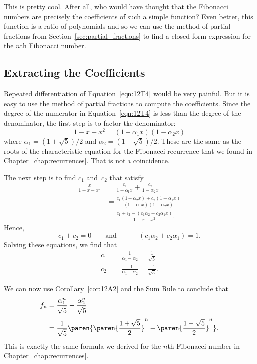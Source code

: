 This is pretty cool.  After all, who would have thought that the
Fibonacci numbers are precisely the coefficients of such a simple
function?  Even better, this function is a ratio of polynomials and so
we can use the method of partial fractions from
Section~\ref{sec:partial_fractions} to find a closed-form
expression for the $n$th Fibonacci number.

\subsection{Extracting the Coefficients}

Repeated differentiation of Equation~\ref{eqn:12T4} would be very
painful.  But it is easy to use the method of partial fractions to
compute the coefficients.  Since the degree of the numerator in
Equation~\ref{eqn:12T4} is less than the degree of the denominator,
the first step is to factor the denominator:
\begin{equation*}
    1 - x - x^2 = (1 - \alpha_1 x) (1 - \alpha_2 x)
\end{equation*}
where $\alpha_1 = (1 + \sqrt{5})/2$ and $\alpha_2 = (1 - \sqrt{5})/2$.
These are the same as the roots of the characteristic equation for the
Fibonacci recurrence that we found in Chapter~\ref{chap:recurrences}.
That is not a coincidence.

The next step is to find $c_1$ and~$c_2$ that satisfy
\begingroup
\openup 3pt
\begin{align*}
\frac{x}{1 - x - x^2}
    &= \frac{c_1}{1 - \alpha_1 x} + \frac{c_2}{1 - \alpha_2 x} \\
    &= \frac{c_1 (1 - \alpha_2 x) + c_2 (1 - \alpha_1 x)}
            {(1 - \alpha_1 x) (1 - \alpha_2 x)} \\
    &= \frac{c_1 + c_2 - (c_1 \alpha_2 + c_2 \alpha_1 x)}
            {1 - x - x^2}.
\end{align*}
\endgroup
Hence,
\begin{equation*}
    c_1 + c_2 = 0
    \qquad\text{and}\qquad
    - (c_1 \alpha_2 + c_2 \alpha_1) = 1.
\end{equation*}
Solving these equations, we find that
\begin{align*}
    c_1 &= \frac{1}{\alpha_1 - \alpha_2} = \frac{1}{\sqrt{5}} \\
    c_2 &= \frac{-1}{\alpha_1 - \alpha_2} = \frac{-1}{\sqrt{5}}.
\end{align*}

We can now use Corollary~\ref{cor:12A2} and the Sum Rule to conclude
that
\begin{align*}
f_n &= \frac{\alpha_1^n}{\sqrt{5}} - \frac{\alpha_2^n}{\sqrt{5}} \\[3pt]
    &= \frac{1}{\sqrt{5}}
        \paren{
            \paren{\frac{1 + \sqrt{5}}{2}}^n - \paren{\frac{1 - \sqrt{5}}{2}}^n
        }.
\end{align*}
This is exactly the same formula we derived for the $n$th Fibonacci
number in Chapter~\ref{chap:recurrences}.

